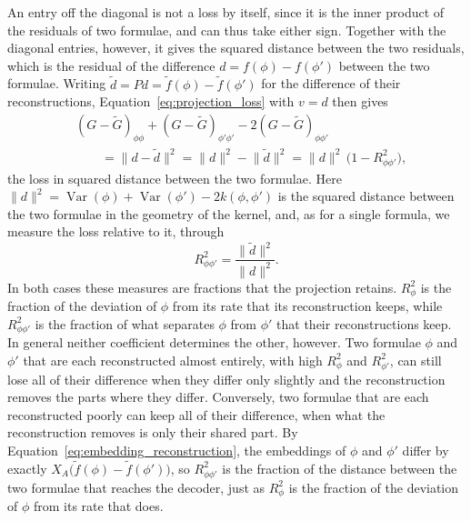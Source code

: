 \documentclass[titlepage,a4paper,11pt]{report}
\begin{document}
    An entry off the diagonal is not a loss by itself, since it is the inner product of the residuals of two formulae, and can thus take either sign. Together with the diagonal entries, however, it gives the squared distance between the two residuals, which is the residual of the difference $d=f(\phi)-f(\phi')$ between the two formulae. Writing $\tilde d=Pd=\tilde f(\phi)-\tilde f(\phi')$ for the difference of their reconstructions, Equation~\eqref{eq:projection_loss} with $v=d$ then gives
    \begin{equation}\label{eq:pair_error}
        \begin{split}
            &(G-\tilde G)_{\phi\phi}+(G-\tilde G)_{\phi'\phi'}-2(G-\tilde G)_{\phi\phi'}\\
            &\qquad=\lVert d-\tilde d\rVert^2
            =\lVert d\rVert^2-\lVert\tilde d\rVert^2
            =\lVert d\rVert^2\,\bigl(1-R^2_{\phi\phi'}\bigr),
        \end{split}
    \end{equation}
    the loss in squared distance between the two formulae. Here $\lVert d\rVert^2=\operatorname{Var}(\phi)+\operatorname{Var}(\phi')-2k(\phi,\phi')$ is the squared distance between the two formulae in the geometry of the kernel, and, as for a single formula, we measure the loss relative to it, through
    \begin{equation}\label{eq:pair_retention}
        R^2_{\phi\phi'}=\frac{\lVert\tilde d\rVert^2}{\lVert d\rVert^2}.
    \end{equation}
    In both cases these measures are fractions that the projection retains. $R^2_\phi$ is the fraction of the deviation of $\phi$ from its rate that its reconstruction keeps, while $R^2_{\phi\phi'}$ is the fraction of what separates $\phi$ from $\phi'$ that their reconstructions keep. In general neither coefficient determines the other, however. Two formulae $\phi$ and $\phi '$ that are each reconstructed almost entirely, with high $R^2_\phi$ and $R^2_{\phi'}$, can still lose all of their difference when they differ only slightly and the reconstruction removes the parts where they differ. Conversely, two formulae that are each reconstructed poorly can keep all of their difference, when what the reconstruction removes is only their shared part. By Equation~\eqref{eq:embedding_reconstruction}, the embeddings of $\phi$ and $\phi'$ differ by exactly $X_A\bigl(\tilde f(\phi)-\tilde f(\phi')\bigr)$, so $R^2_{\phi\phi'}$ is the fraction of the distance between the two formulae that reaches the decoder, just as $R^2_\phi$ is the fraction of the deviation of $\phi$ from its rate that does.
\end{document}
